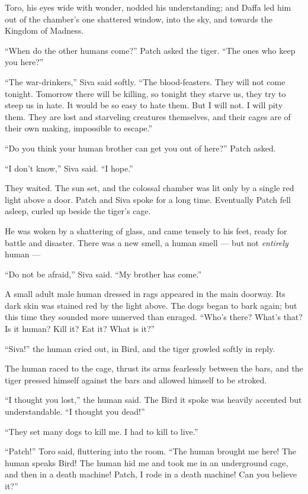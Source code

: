 \documentclass[12pt]{memoir}
\begin{document}
Toro, his eyes wide with wonder, nodded his understanding; and Daffa
led him out of the chamber’s one shattered window, into the sky, and
towards the Kingdom of Madness.

“When do the other humans come?” Patch asked the tiger. “The ones who
keep you here?”

“The war-drinkers,” Siva said softly. “The blood-feasters. They will
not come tonight. Tomorrow there will be killing, so tonight they
starve us, they try to steep us in hate. It would be so easy to hate
them. But I will not. I will pity them. They are lost and starveling
creatures themselves, and their cages are of their own making,
impossible to escape.”

“Do you think your human brother can get you out of here?” Patch
asked.

“I don’t know,” Siva said. “I hope.”

They waited. The sun set, and the colossal chamber was lit only by a
single red light above a door. Patch and Siva spoke for a long
time. Eventually Patch fell asleep, curled up beside the tiger’s cage.

He was woken by a shattering of glass, and came tensely to his feet,
ready for battle and disaster. There was a new smell, a human smell —
but not \textit{entirely} human —

“Do not be afraid,” Siva said. “My brother has come.”

A small adult male human dressed in rags appeared in the main
doorway. Its dark skin was stained red by the light above. The dogs
began to bark again; but this time they sounded more unnerved than
enraged. “Who’s there? What’s that? Is it human? Kill it? Eat it?
What is it?”

“Siva!” the human cried out, in Bird, and the tiger growled softly in
reply.

The human raced to the cage, thrust its arms fearlessly between the
bars, and the tiger pressed himself against the bars and allowed
himself to be stroked.

“I thought you lost,” the human said. The Bird it spoke was heavily
accented but understandable. “I thought you dead!”

“They set many dogs to kill me. I had to kill to live.”

“Patch!” Toro said, fluttering into the room. “The human brought me
here! The human speaks Bird! The human hid me and took me in an
underground cage, and then in a death machine! Patch, I rode in a
death machine! Can you believe it?”
\end{document}
